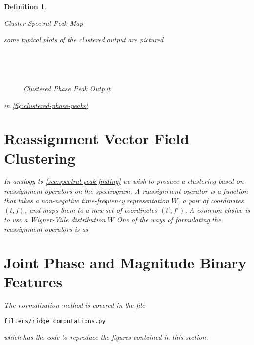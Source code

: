 \documentclass[english]{article}
\newtheorem{defn}{Definition}[section]
\begin{document}
\begin{defn}
\begin{algorithm}[t]
\caption{Cluster Spectral Peak Map}
\label{alg:mean-shift-peak}
\end{algorithm}
some typical plots of the clustered output are pictured
\begin{figure}
\begin{subfigure}
\texttt{[image: exp/binary\_phase\_meanshift/plots/mean\_shift\_binary\_phase\_peaks\_train\_dr7\_mclk0\_sa2\_0.png]}
\end{subfigure}
~
\begin{subfigure}
\texttt{[image: exp/binary\_phase\_meanshift/plots/mean\_shift\_binary\_phase\_peaks\_fcjf0\_sa1\_0.png]}
\end{subfigure}

~
\begin{subfigure}
\texttt{[image: exp/binary\_phase\_meanshift/plots/mean\_shift\_binary\_phase\_peaks\_train\_dr6\_mdrd0\_sx302\_0.png]}
\end{subfigure}

\caption{Clustered Phase Peak Output}
\label{fig:clustered-phase-peaks}
\end{figure}
in \autoref{fig:clustered-phase-peaks}.

\section{Reassignment Vector Field Clustering}

In analogy to \autoref{sec:spectral-peak-finding} we wish to produce a clustering based
on reassignment operators on the spectrogram.  A reassignment operator is a function
that takes a non-negative time-frequency representation $W$, a pair of coordinates $(t,f)$, and maps them to a new
set of coordinates $(t',f')$.  A common choice is to use a Wigner-Ville distribution $W$  One of the ways of formulating the reassignment
operators is as
\begin{equation}

\end{equation}

\section{Joint Phase and Magnitude Binary Features}

The normalization method is covered in the file 
\begin{lstlisting}
filters/ridge_computations.py
\end{lstlisting}
which has the code to reproduce the figures contained in this section.


\end{defn}
\end{document}
